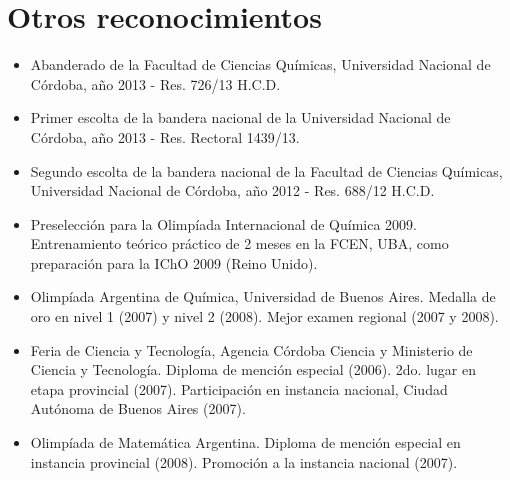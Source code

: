 \documentclass[10pt]{article}
\begin{document}
\section{Otros reconocimientos}
\begin{itemize}
\item Abanderado de la Facultad de Ciencias Químicas, Universidad Nacional de Córdoba, año 2013 - Res. 726/13 H.C.D. 
\item {Primer escolta de la bandera nacional de la Universidad Nacional de Córdoba, año 2013 - Res. Rectoral 1439/13}.
 \item {Segundo escolta de la bandera nacional de la Facultad de Ciencias Químicas, Universidad Nacional de Córdoba, año 2012 - Res. 688/12 H.C.D.}
 \item {Preselección para la Olimpíada Internacional de Química 2009}. Entrenamiento teórico práctico de 2 meses en la FCEN, UBA, como preparación para la IChO 2009 (Reino Unido).
 \item {Olimpíada Argentina de Química}, Universidad de Buenos Aires. Medalla de oro en nivel 1 (2007) y nivel 2 (2008). Mejor examen regional (2007 y 2008).
 \item {Feria de Ciencia y Tecnología}, Agencia Córdoba Ciencia y Ministerio de Ciencia y Tecnología.
Diploma de mención especial (2006). 2do. lugar en etapa provincial (2007). Participación en instancia
nacional, Ciudad Autónoma de Buenos Aires (2007).
\item {Olimpíada de Matemática Argentina.} Diploma de mención especial en instancia provincial (2008). Promoción a la instancia nacional (2007).
\end{itemize}
\end{document}

